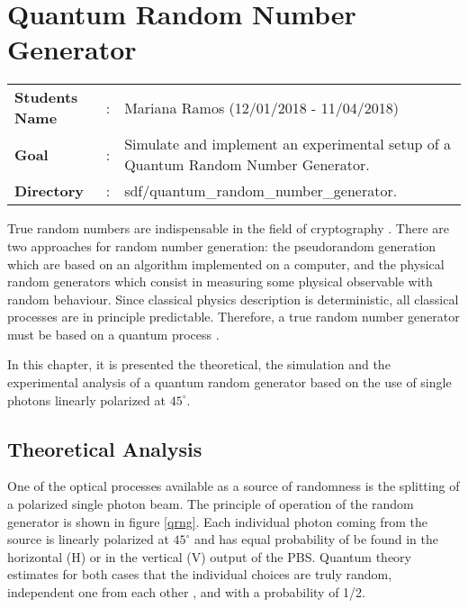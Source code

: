 \clearpage
\section{Quantum Random Number Generator}

\begin{refsection}

\begin{tcolorbox}	
\begin{tabular}{p{2.75cm} p{0.2cm} p{10.5cm}} 	
\textbf{Students Name}  &:& Mariana Ramos (12/01/2018 - 11/04/2018)\\
\textbf{Goal}          &:& Simulate and implement an experimental setup of a Quantum Random Number Generator.\\
\textbf{Directory}          &:& sdf/quantum\_random\_number\_generator.
\end{tabular}
\end{tcolorbox}

True random numbers are indispensable in the field of cryptography \cite{Katsoprinakis08}. There are two approaches for random number generation: the pseudorandom generation which are based on an algorithm implemented on a computer, and the physical random generators which consist in measuring some physical observable with random behaviour. Since classical physics description is deterministic, all classical processes are in principle predictable. Therefore, a true random number generator must be based on a quantum process \cite{Jennewein00}.

In this chapter, it is presented the theoretical, the simulation and the experimental analysis of a quantum random generator based on the use of single photons linearly polarized at $45^{\circ}$.

\subsection{Theoretical Analysis}

One of the optical processes available as a source of randomness is the splitting of a polarized single photon beam. The principle of operation of the random generator is shown in figure \ref{qrng}. Each individual photon coming from the source is linearly polarized at $45^\circ$ and has equal probability of be found in the horizontal (H) or in the vertical (V) output of the PBS. Quantum theory estimates for both cases that the individual choices are truly random, independent one from each other , and with a probability of 1/2.


\end{refsection}
